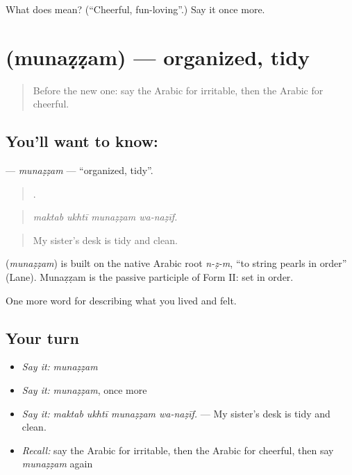 \begin{tcolorbox}[breakable,colback=teal!4,colframe=teal!35!black,title={Before you move on}]
What does  mean? (\textquotedblleft{}Cheerful, fun-loving\textquotedblright{}.) Say it once more.
\end{tcolorbox}
\section[\texorpdfstring{\ar{منظم} (munaẓẓam)}{منظم (munaẓẓam)}]{ (munaẓẓam) — organized, tidy}

\label{lesson:AR-C503-munazzam}



\begin{quote}
Before the new one: say the Arabic for irritable, then the Arabic for cheerful.
\end{quote}

\subsection*{You'll want to know: }
\textbf{} — \emph{munaẓẓam} — \textquotedblleft{}organized, tidy\textquotedblright{}.

\begin{quote}
   .
\end{quote}

\begin{quote}
\emph{maktab ukhtī munaẓẓam wa-naẓīf.}
\end{quote}

\begin{quote}
My sister's desk is tidy and clean.
\end{quote}

\begin{cousinweb}
\textbf{} (\emph{munaẓẓam}) is built on the native Arabic root \emph{n-ẓ-m}, \textquotedblleft{}to string pearls in order\textquotedblright{} (Lane). Munaẓẓam is the passive participle of Form II: set in order.
\end{cousinweb}

\begin{grammarlens}[title={What you've built}]
One more word for describing what you lived and felt.
\end{grammarlens}

\subsection*{Your turn}
\begin{itemize}
\raggedright
  \item \emph{Say it:} \emph{munaẓẓam}
  \item \emph{Say it:} \emph{munaẓẓam}, once more
  \item \emph{Say it:} \emph{maktab ukhtī munaẓẓam wa-naẓīf.} — My sister's desk is tidy and clean.
  \item \emph{Recall:} say the Arabic for irritable, then the Arabic for cheerful, then say \emph{munaẓẓam} again
\end{itemize}

